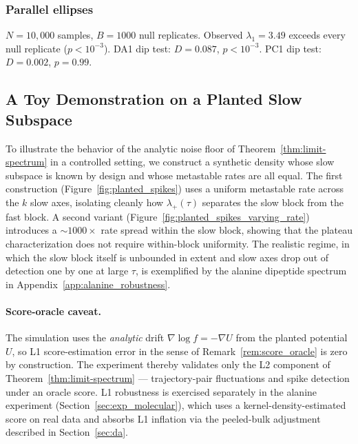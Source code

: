 \documentclass{article}
\begin{document}
\subsubsection{Parallel ellipses}
\label{app:validation_ellipses}

$N = 10{,}000$ samples, $B = 1000$ null replicates. Observed $\lambda_1 = 3.49$ exceeds every null replicate ($p < 10^{-3}$). DA1 dip test: $D = 0.087$, $p < 10^{-3}$. PC1 dip test: $D = 0.002$, $p = 0.99$.




\subsection{A Toy Demonstration on a Planted Slow Subspace}
\label{app:planted_spikes}

To illustrate the behavior of the analytic noise floor of Theorem~\ref{thm:limit-spectrum} in a controlled setting, we construct a synthetic density whose slow subspace is known by design and whose metastable rates are all equal. The first construction (Figure~\ref{fig:planted_spikes}) uses a uniform metastable rate across the $k$ slow axes, isolating cleanly how $\lambda_+(\tau)$ separates the slow block from the fast block. A second variant (Figure~\ref{fig:planted_spikes_varying_rate}) introduces a ${\sim}1000\times$ rate spread within the slow block, showing that the plateau characterization does not require within-block uniformity. The realistic regime, in which the slow block itself is unbounded in extent and slow axes drop out of detection one by one at large $\tau$, is exemplified by the alanine dipeptide spectrum in Appendix~\ref{app:alanine_robustness}.

\paragraph{Score-oracle caveat.}
The simulation uses the \emph{analytic} drift $\nabla \log f = -\nabla U$
from the planted potential $U$, so L1 score-estimation error in the
sense of Remark~\ref{rem:score_oracle} is zero by construction. The
experiment thereby validates only the L2 component of
Theorem~\ref{thm:limit-spectrum} — trajectory-pair fluctuations and
spike detection under an oracle score. L1 robustness is exercised
separately in the alanine experiment
(Section~\ref{sec:exp_molecular}), which uses a kernel-density-estimated
score on real data and absorbs L1 inflation via the peeled-bulk
adjustment described in Section~\ref{sec:da}.
\end{document}
